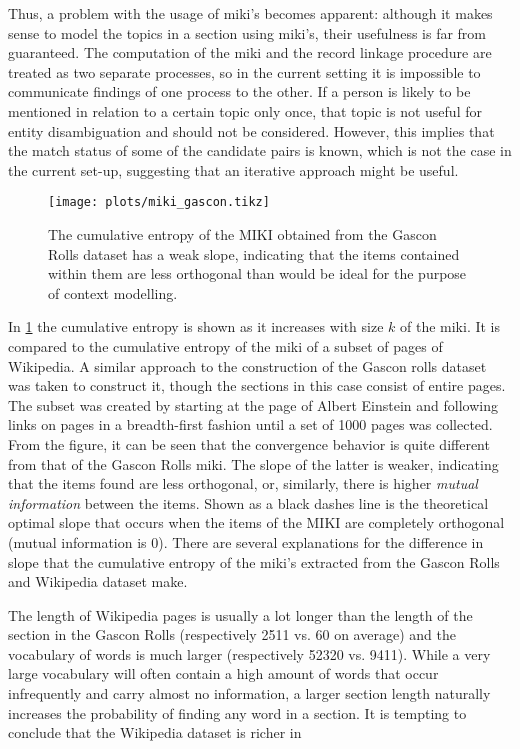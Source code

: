 Thus, a problem with the usage of miki's becomes apparent: although it makes sense to model the topics in a section using miki's, their usefulness is far from guaranteed.
The computation of the miki and the record linkage procedure are treated as two separate processes, so in the current setting it is impossible to communicate findings of one process to the other.
If a person is likely to be mentioned in relation to a certain topic only once, that topic is not useful for entity disambiguation and should not be considered.
However, this implies that the match status of some of the candidate pairs is known, which is not the case in the current set-up, suggesting that an iterative approach might be useful.

\begin{figure}
    \centering
    \texttt{[image: plots/miki\_gascon.tikz]}
    \caption{The cumulative entropy of the MIKI obtained from the Gascon Rolls dataset has a weak slope, indicating that the items contained within them are less orthogonal than would be ideal for the purpose of context modelling.}
    \label{fig:gascon_convergence}
\end{figure}

In \cref{fig:gascon_convergence} the cumulative entropy is shown as it increases with size $k$ of the miki.
It is compared to the cumulative entropy of the miki of a subset of pages of Wikipedia.
A similar approach to the construction of the Gascon rolls dataset was taken to construct it, though the sections in this case consist of entire pages.
The subset was created by starting at the page of Albert Einstein and following links on pages in a breadth-first fashion until a set of \num{1000} pages was collected.
From the figure, it can be seen that the convergence behavior is quite different from that of the Gascon Rolls miki.
The slope of the latter is weaker, indicating that the items found are less orthogonal, or, similarly, there is higher \emph{mutual information} between the items.
Shown as a black dashes line is the theoretical optimal slope that occurs when the items of the MIKI are completely orthogonal (mutual information is $0$).
There are several explanations for the difference in slope that the cumulative entropy of the miki's extracted from the Gascon Rolls and Wikipedia dataset make.

The length of Wikipedia pages is usually a lot longer than the length of the section in the Gascon Rolls (respectively \num{2511} vs. \num{60} on average) and the vocabulary of words is much larger (respectively \num{52320} vs. \num{9411}).
While a very large vocabulary will often contain a high amount of words that occur infrequently and carry almost no information, a larger section length naturally increases the probability of finding any word in a section.
It is tempting to conclude that the Wikipedia dataset is richer in 

